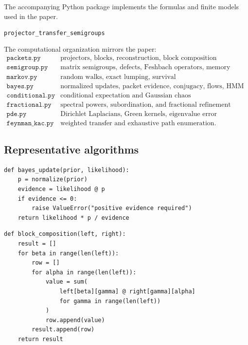 \documentclass[11pt,letterpaper]{article}
\theoremstyle{plain}
\theoremstyle{plain}
\theoremstyle{plain}
\theoremstyle{definition}
\theoremstyle{definition}
\theoremstyle{definition}
\theoremstyle{definition}
\theoremstyle{definition}
\theoremstyle{remark}
\theoremstyle{remark}
\theoremstyle{remark}
\theoremstyle{remark}
\theoremstyle{remark}
\theoremstyle{remark}
\begin{document}
The accompanying Python package implements the formulas and finite models used in the paper.
\begin{center}
\texttt{projector\_transfer\_semigroups}
\end{center}
The computational organization mirrors the paper:
\[
\begin{array}{c|l}
\texttt{packets.py} & \text{projectors, blocks, reconstruction, block composition}\\
\texttt{semigroup.py} & \text{matrix semigroups, defects, Feshbach operators, memory}\\
\texttt{markov.py} & \text{random walks, exact lumping, survival}\\
\texttt{bayes.py} & \text{normalized updates, packet evidence, conjugacy, flows, HMM}\\
\texttt{conditional.py} & \text{conditional expectation and Gaussian chaos}\\
\texttt{fractional.py} & \text{spectral powers, subordination, and fractional refinement certificates}\\
\texttt{pde.py} & \text{Dirichlet Laplacians, Green kernels, eigenvalue error}\\
\texttt{feynman\_kac.py} & \text{weighted transfer and exhaustive path enumeration}.
\end{array}
\]

\subsection{Representative algorithms}

\begin{lstlisting}[caption={Normalized finite Bayesian update.}]
def bayes_update(prior, likelihood):
    p = normalize(prior)
    evidence = likelihood @ p
    if evidence <= 0:
        raise ValueError("positive evidence required")
    return likelihood * p / evidence
\end{lstlisting}

\begin{lstlisting}[caption={Packet block composition.}]
def block_composition(left, right):
    result = []
    for beta in range(len(left)):
        row = []
        for alpha in range(len(left)):
            value = sum(
                left[beta][gamma] @ right[gamma][alpha]
                for gamma in range(len(left))
            )
            row.append(value)
        result.append(row)
    return result
\end{lstlisting}
\end{document}
